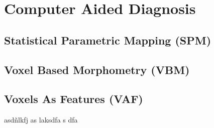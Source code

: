 \chapter{Computer Aided Diagnosis}\label{ch:cad}

\section{Statistical Parametric Mapping (SPM)}

\section{Voxel Based Morphometry (VBM)}

\section{Voxels As Features (VAF)}

asdñlkfj as
laksdfa
s dfa
